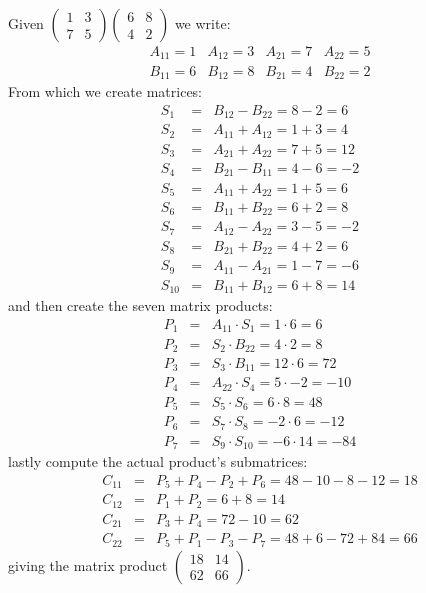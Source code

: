 Given $
\begin{pmatrix}
	1 & 3 \\
	7 & 5
\end{pmatrix}
\begin{pmatrix}
	6 & 8 \\
	4 & 2
\end{pmatrix}
$ we write:
\begin{equation*}
\begin{matrix}
	A_{11} = 1 & A_{12} = 3 & A_{21} = 7 & A_{22} = 5 \\
	B_{11} = 6 & B_{12} = 8 & B_{21} = 4 & B_{22} = 2
\end{matrix}
\end{equation*}
From which we create matrices:
\begin{eqnarray*}
	S_1 & = & B_{12} - B_{22} = 8 - 2 = 6 \\
	S_2 & = & A_{11} + A_{12} = 1 + 3 = 4 \\
	S_3 & = & A_{21} + A_{22} = 7 + 5 = 12 \\
	S_4 & = & B_{21} - B_{11} = 4 - 6 = -2 \\
	S_5 & = & A_{11} + A_{22} = 1 + 5 = 6 \\
	S_6 & = & B_{11} + B_{22} = 6 + 2 = 8 \\
	S_7 & = & A_{12} - A_{22} = 3 - 5 = -2 \\
	S_8 & = & B_{21} + B_{22} = 4 + 2 = 6 \\
	S_9 & = & A_{11} - A_{21} = 1 - 7 = -6 \\
	S_{10} & = & B_{11} + B_{12} = 6 + 8 = 14
\end{eqnarray*}
and then create the seven matrix products:
\begin{eqnarray*}
	P_1 & = & A_{11} \cdot S_1 = 1 \cdot 6 = 6 \\
	P_2 & = & S_2 \cdot B_{22} = 4 \cdot 2 = 8 \\
	P_3 & = & S_3 \cdot B_{11} = 12 \cdot 6 = 72 \\
	P_4 & = & A_{22} \cdot S_4 = 5 \cdot -2 = -10 \\
	P_5 & = & S_5 \cdot S_6 = 6 \cdot 8 = 48 \\
	P_6 & = & S_7 \cdot S_8 = -2 \cdot 6 = -12 \\
	P_7 & = & S_9 \cdot S_{10} = -6 \cdot 14 = -84
\end{eqnarray*}
lastly compute the actual product's submatrices:
\begin{eqnarray*}
	C_{11} & = & P_5 + P_4 - P_2 + P_6 = 48 - 10 - 8 - 12 = 18 \\
	C_{12} & = & P_1 + P_2 = 6 + 8 = 14 \\
	C_{21} & = & P_3 + P_4 = 72 - 10 = 62 \\
	C_{22} & = & P_5 + P_1 - P_3 -P_7 = 48 + 6 -72 + 84 = 66
\end{eqnarray*}
giving the matrix product $
\begin{pmatrix}
	18 & 14 \\
	62 & 66
\end{pmatrix}$.
